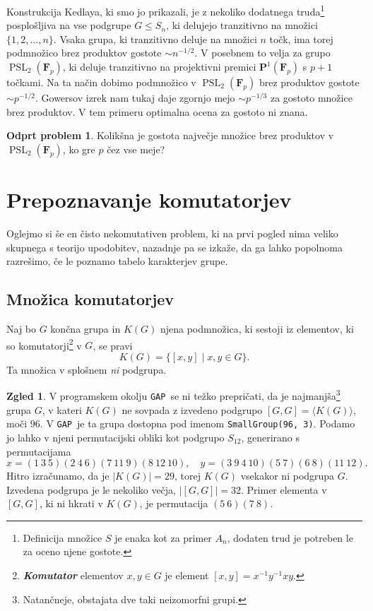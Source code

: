 \documentclass[11pt]{book}
\def\FF{\mathbf{F}}
\def\PP{\mathbf{P}}
\def\GAP{\texttt{GAP}}
\DeclareMathOperator\PSL{PSL}
\def\definicija{\color{rdeca}\bf\em}
\theoremstyle{definition}
\theoremstyle{zgled}
\newtheorem*{zgled}{Zgled}
\theoremstyle{odprtproblem}
\newtheorem*{odprtproblem}{Odprt problem}
\theoremstyle{domacanaloga}
\theoremstyle{izrek}
\begin{document}
Konstrukcija Kedlaya, ki smo jo prikazali, je z nekoliko dodatnega truda\footnote{Definicija množice $S$ je enaka kot za primer $A_n$, dodaten trud je potreben le za oceno njene gostote.} posplošljiva na vse podgrupe $G \leq S_n$, ki delujejo tranzitivno na množici $\{ 1,2,\dots, n\}$. Vsaka grupa, ki tranzitivno deluje na množici $n$ točk, ima torej podmnožico brez produktov gostote $\sim n^{-1/2}$. V posebnem to velja za grupo $\PSL_2(\FF_p)$, ki deluje tranzitivno na projektivni premici $\PP^1(\FF_p)$ s $p+1$ točkami. Na ta način dobimo podmnožico v $\PSL_2(\FF_p)$ brez produktov gostote $\sim p^{-1/2}$. Gowersov izrek nam tukaj daje zgornjo mejo $\sim p^{-1/3}$ za gostoto množice brez produktov. V tem primeru optimalna ocena za gostoto ni znana.

\begin{odprtproblem}
Kolikšna je gostota največje množice brez produktov v $\PSL_2(\FF_p)$, ko gre $p$ čez vse meje?
\end{odprtproblem}

\section{Prepoznavanje komutatorjev}

Oglejmo si še en čisto nekomutativen problem, ki na prvi pogled nima veliko skupnega s teorijo upodobitev, nazadnje pa se izkaže, da ga lahko popolnoma razrešimo, če le poznamo tabelo karakterjev grupe.

\subsection{Množica komutatorjev}

Naj bo $G$ končna grupa in $K(G)$ njena podmnožica, ki sestoji iz elementov, ki so komutatorji\footnote{{\definicija Komutator} elementov $x,y \in G$ je element $[x,y] = x^{-1} y^{-1} x y$.} v $G$, se pravi
\[
    K(G) = \{ [x,y] \mid x,y \in G \}.
\]
Ta množica v splošnem \emph{ni} podgrupa.

\begin{zgled}
V programskem okolju \GAP~se ni težko prepričati, da je najmanjša\footnote{Natančneje, obstajata dve taki neizomorfni grupi.} grupa $G$, v kateri $K(G)$ ne sovpada z izvedeno podgrupo $[G,G] = \langle K(G) \rangle$, moči $96$. V \GAP~je ta grupa dostopna pod imenom \texttt{SmallGroup(96, 3)}. Podamo jo lahko v njeni permutacijski obliki kot podgrupo $S_{12}$, generirano s permutacijama
\[
    x = (1 \ 3 \ 5)(2 \ 4 \ 6)(7 \ 11 \ 9)(8 \ 12 \ 10), \quad
    y = (3 \ 9 \ 4 \ 10)(5 \ 7)(6 \ 8)(11 \ 12).
\]
Hitro izračunamo, da je $|K(G)| = 29$, torej $K(G)$ vsekakor ni podgrupa $G$. Izvedena podgrupa je le nekoliko večja, $|[G,G]| = 32$. Primer elementa v $[G,G]$, ki ni hkrati v $K(G)$, je permutacija $(5 \ 6)(7 \ 8)$. 
\end{zgled}
\end{document}
